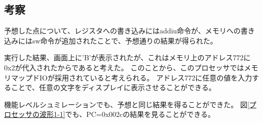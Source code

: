 \subsection{考察}
予想した点について、レジスタへの書き込みにはaddiu命令が、メモリへの書き込みにはsw命令が追加されたことで、予想通りの結果が得られた。

実行した結果、画面上に'B'が表示されたが、これはメモリ上のアドレス772に0x2が代入されたからであると考えた。
このことから、このプロセッサではメモリマップドIOが採用されていると考えられる。
アドレス772に任意の値を入力することで、任意の文字をディスプレイに表示させることができる。

機能レベルシュミレーションでも、予想と同じ結果を得ることができた。
図\ref{プロセッサの波形1-1}でも、PC=0x002cの結果を見ることができる。
